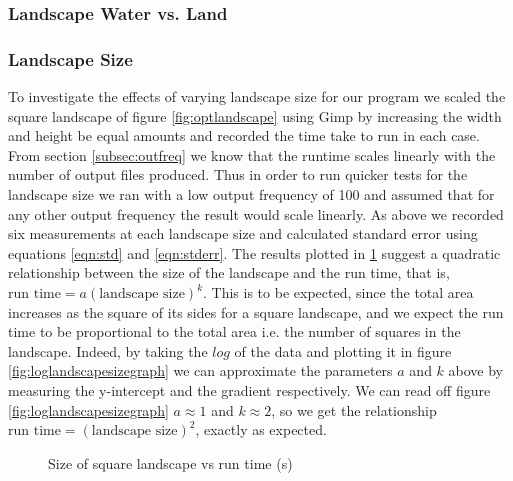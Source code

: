 \subsubsection{Landscape Water vs. Land}
\label{subsub:watervsland}

\subsubsection{Landscape Size}
\label{subsub:landscapesize}
To investigate the effects of varying landscape size for our program we scaled the square landscape of figure \ref{fig:optlandscape} using Gimp by increasing the width and height be equal amounts and recorded the time take to run in each case. From section \ref{subsec:outfreq} we know that the runtime scales linearly with the number of output files produced. Thus in order to run quicker tests for the landscape size we ran with a low output frequency of 100 and assumed that for any other output frequency the result would scale linearly. As above we recorded six measurements at each landscape size and calculated standard error using equations \ref{eqn:std} and \ref{eqn:stderr}. The results plotted in \ref{fig:landscapesizegraph} suggest a quadratic relationship between the size of the landscape and the run time, that is, $\text{run time} = a (\text{landscape size}) ^k$. This is to be expected, since the total area increases as the square of its sides for a square landscape, and we expect the run time to be proportional to the total area i.e. the number of squares in the landscape. Indeed, by taking the $log$ of the data and plotting it in figure \ref{fig:loglandscapesizegraph} we can approximate the parameters $a$ and $k$ above by measuring the y-intercept and the gradient respectively. We can read off figure \ref{fig:loglandscapesizegraph}  $a \approx 1$ and $k \approx 2$, so we get the relationship $\text{run time} = (\text{landscape size}) ^2$, exactly as expected.
\begin{figure}[!h]
\centering
{}
\caption{Size of square landscape vs run time (s)}
\label{fig:landscapesizegraph}
\end{figure}

